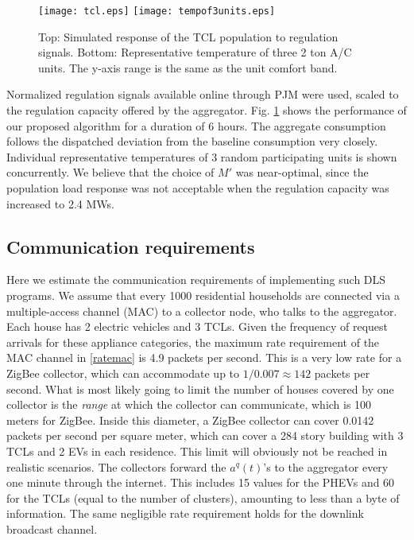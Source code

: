 \documentclass[10pt]{IEEEtran}
\begin{document}
\begin{figure}[h!]
  \centering
      \texttt{[image: tcl.eps]}
\texttt{[image: tempof3units.eps]}
  \caption{Top: Simulated response of the TCL population to regulation signals. Bottom: Representative temperature of three 2 ton A/C units. The y-axis range is the same as the unit comfort band.}
  \vspace{-.5cm}
\label{tclresponse10000}
\end{figure}

Normalized regulation signals available online through PJM were used, scaled to the regulation capacity offered by the aggregator.
Fig. \ref{tclresponse10000} shows the performance of our proposed algorithm for a duration of 6 hours. The aggregate consumption follows the dispatched deviation from the baseline consumption very closely. Individual representative temperatures of 3 random participating units is shown concurrently. We believe that the choice of $M'$ was near-optimal, since the population load response was not acceptable when the regulation capacity was increased to 2.4 MWs.

\subsection{Communication requirements}\label{sec.tp}
Here we estimate the communication requirements of implementing such DLS programs. We assume that every 1000 residential households are connected via a multiple-access channel (MAC) to  a collector node, who talks to the aggregator. Each house has 2 electric vehicles and 3 TCLs. Given the frequency of request arrivals for these appliance categories, the maximum rate requirement of the MAC channel in \eqref{ratemac} is 4.9 packets per second. This is a very low rate for a ZigBee collector, which can accommodate up to $1/0.007 \approx 142$ packets per second. What is most likely going to limit the number of houses  covered by one collector is the {\it range} at which the collector can  communicate, which is 100 meters for ZigBee. Inside this diameter, a ZigBee collector can cover 0.0142 packets per second per square meter, which can cover a 284 story building with 3 TCLs and 2 EVs in each residence. This limit will obviously not be reached in realistic scenarios. The collectors forward the $a^q(t)$'s to the aggregator every one minute through the internet. This includes 15 values for the PHEVs and 60 for the TCLs (equal to the number of clusters), amounting to less than a byte of information. The same negligible rate requirement holds for the downlink broadcast channel.
\end{document}
